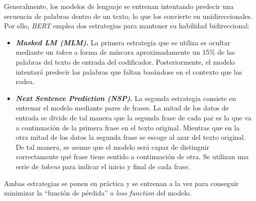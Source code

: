 Generalmente, los modelos de lenguaje se entrenan intentando predecir una secuencia de palabras dentro de un texto, lo que los convierte en unidireccionales. Por ello, \textit{BERT} emplea dos estrategias para mantener su habilidad bidireccional:

\begin{itemize}
    \item \textbf{\textit{Masked LM (MLM)}.} La primera estrategia que se utiliza es ocultar mediante un \textit{token} a forma de máscara aproximadamente un 15\% de las palabras del texto de entrada del codificador. Posteriormente, el modelo intentará predecir las palabras que faltan basándose en el contexto que las rodea.
    \item \textbf{\textit{Next Sentence Prediction (NSP)}.} La segunda estrategia consiste en entrenar el modelo mediante pares de frases. La mitad de los datos de entrada se divide de tal manera que la segunda frase de cada par es la que va a continuación de la primera frase en el texto original. Mientras que en la otra mitad de los datos la segunda frase se escoge al azar del texto original. De tal manera, se asume que el modelo será capaz de distinguir correctamente qué frase tiene sentido a continuación de otra. Se utilizan una serie de \textit{tokens} para indicar el inicio y final de cada frase.
\end{itemize}

Ambas estrategias se ponen en práctica y se entrenan a la vez para conseguir minimizar la ``función de pérdida'' o \textit{loss function} del modelo.